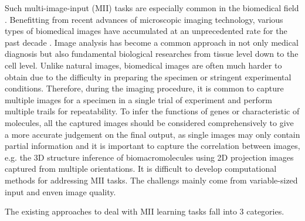 \documentclass[10pt,twocolumn,letterpaper]{article}
\begin{document}
Such multi-image-input (MII) tasks are especially common in the biomedical field \cite{annofly, MIMT-CNN, li2012drosophila, ref27}. 
Benefitting from recent advances of microscopic imaging technology, various types of biomedical images have accumulated at an unprecedented rate for the past decade \cite{ref11,ref12,ref13,ref14}. Image analysis has become a common approach in not only medical diagnosis but also fundamental biological researches from tissue level down to the cell level. Unlike natural images, biomedical images are often much harder to obtain due to the difficulty in preparing the specimen or stringent experimental conditions. Therefore, during the imaging procedure, it is common to capture multiple images for a specimen in a single trial of experiment and perform multiple trails for repeatability. To infer the functions of genes or characteristic of molecules, all the captured images should be considered comprehensively to give a more accurate judgement on the final output, as single images may only contain partial information and it is important to capture the correlation between images, e.g. the 3D structure inference of biomacromolecules using 2D projection images captured from multiple orientations. It is difficult to develop computational methods for addressing MII tasks. The challengs mainly come from variable-sized input and enven image quality.


%

The existing approaches to deal with MII learning tasks fall into 3 categories.
\end{document}

